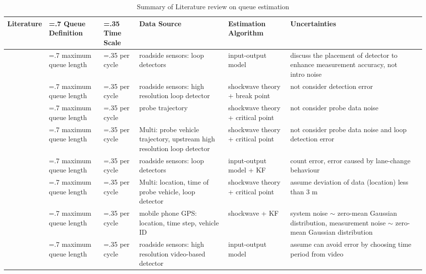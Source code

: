 \begin{landscape}
\begin{table}
\centering
\footnotesize 
\caption{Summary of Literature review on queue estimation \uppercase\expandafter{}}
\label{LR1}
\begin{tabularx}{\linewidth}{@{} l 
>{\hsize=.7\hsize}X  %
>{\hsize=.35\hsize}X  %
>{\hsize=1.2\hsize}X  %
>{\hsize=0.8\hsize}X %
>{\hsize=1.2\hsize}X %
>{\hsize=1\hsize}X %
@{}} 
\toprule
\textbf{Literature} & \textbf{Queue Definition} & \textbf{Time Scale} & \textbf{Data Source} & \textbf{Estimation Algorithm} & \textbf{Uncertainties} \\
\midrule
\textcite{sharma2007input} & maximum queue length & per cycle & roadside sensors: loop detectors & input-output model & discuss the placement of detector to enhance measurement accuracy, not intro noise \\
\textcite{liu2009real} & maximum queue length & per cycle & roadside sensors: high resolution loop detector & shockwave theory + break point & not consider detection error \\
\textcite{cheng2012exploratory} & maximum queue length & per cycle & probe trajectory & shockwave theory + critical point & not consider probe data noise \\
\textcite{cai2014shock} & maximum queue length & per cycle & Multi: probe vehicle trajectory, upstream high resolution loop detector & shockwave theory + critical point & not consider probe data noise and loop detection error \\
\textcite{lee2015real} & maximum queue length & per cycle & roadside sensors: loop detectors & input-output model + KF & count error, error caused by lane-change behaviour \\
\textcite{wang2015cycle} & maximum queue length & per cycle & Multi: location, time of probe vehicle, loop detector & shockwave theory + critical point & assume deviation of data (location) less than 3 m \\
\textcite{yin2018kalman} & maximum queue length & per cycle & mobile phone GPS: location, time step, vehicle ID & shockwave + KF & system noise $\sim$ zero-mean Gaussian distribution, measurement noise $\sim$ zero-mean Gaussian distribution \\
\textcite{an2018real} & maximum queue length & per cycle & roadside sensors: high resolution video-based detector & input-output model & assume can avoid error by choosing time period from video \\

\end{tabularx}
\end{table}
\end{landscape}
